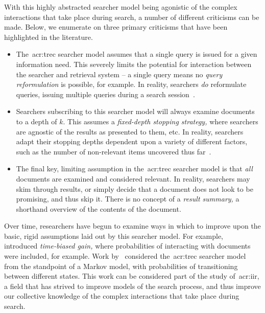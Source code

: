 With this highly abstracted searcher model being agonistic of the complex interactions that take place during search, a number of different criticisms can be made. Below, we enumerate on three primary criticisms that have been highlighted in the literature.

\begin{itemize}
    \item{ The~\gls{acr:trec} searcher model assumes that a single query is issued for a given information need. This severely limits the potential for interaction between the searcher and retrieval system -- a single query means no \emph{query reformulation} is possible, for example. In reality, searchers \emph{do} reformulate queries, issuing multiple queries during a search session~\citep{keskustalo2009querying}.}
    \item{ Searchers subscribing to this searcher model will always examine documents to a depth of $k$. This assumes a \emph{fixed-depth stopping strategy,} where searchers are agnostic of the results as presented to them, etc. In reality, searchers adapt their stopping depths dependent upon a variety of different factors, such as the number of non-relevant items uncovered thus far~\citep{cooper1973retrieval_effectiveness_ii}.}
    \item{ The final key, limiting assumption in the~\gls{acr:trec} searcher model is that \emph{all} documents are examined and considered relevant. In reality, searchers may skim through results, or simply decide that a document does not look to be promising, and thus skip it. There is no concept of a \emph{result summary,} a shorthand overview of the contents of the document.}
\end{itemize}

Over time, researchers have begun to examine ways in which to improve upon the basic, rigid assumptions laid out by this searcher model. For example,~\cite{smucker2012tbg} introduced \emph{time-biased gain,} where probabilities of interacting with documents were included, for example. Work by~\cite{tran2017markov_models} considered the~\gls{acr:trec} searcher model from the standpoint of a Markov model, with probabilities of transitioning between different states. This work can be considered part of the study of~\gls{acr:iir}, a field that has strived to improve models of the search process, and thus improve our collective knowledge of the complex interactions that take place during search.

